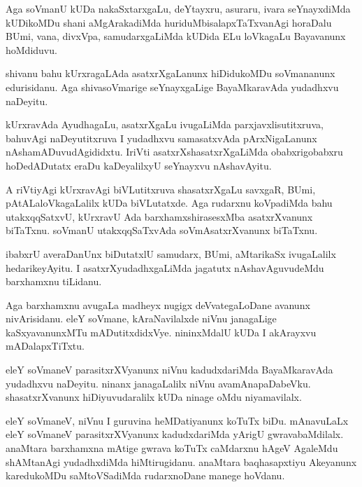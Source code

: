 \documentclass{article}
\begin{document}
\begin{mn}%
Aga soVmanU kUDa nakaSxtarxgaLu, deYtayxru, asuraru, ivara
seYnayxdiMda kUDikoMDu shani aMgArakadiMda huriduMbisalapxTaTxvanAgi
horaDalu BUmi, vana, divxVpa, samudarxgaLiMda kUDida ELu loVkagaLu
Bayavanunx hoMdiduvu.
\end{mn}

\begin{mn}
shivanu bahu kUrxragaLAda asatxrXgaLanunx hiDidukoMDu soVmananunx
edurisidanu. Aga shivasoVmarige seYnayxgaLige BayaMkaravAda yudadhxvu naDeyitu.
\end{mn}

\begin{mn}
kUrxravAda AyudhagaLu, asatxrXgaLu ivugaLiMda parxjavxlisutitxruva,
bahuvAgi naDeyutitxruva I yudadhxvu samasatxvAda pArxNigaLanunx
nAshamADuvudAgididxtu. IriVti asatxrXshasatxrXgaLiMda obabxrigobabxru
hoDedADutatx eraDu kaDeyalilxyU seYnayxvu nAshavAyitu.
\end{mn}

\begin{mn}%
A riVtiyAgi kUrxravAgi biVLutitxruva shasatxrXgaLu savxgaR, BUmi,
pAtALaloVkagaLalilx kUDa biVLutatxde. Aga rudarxnu koVpadiMda bahu
utakxqqSatxvU, kUrxravU Ada barxhamxshirasesxMba asatxrXvanunx
biTaTxnu. soVmanU utakxqqSaTxvAda soVmAsatxrXvanunx biTaTxnu.
\end{mn}

\begin{mn}
ibabxrU averaDanUnx biDutatxlU samudarx, BUmi, aMtarikaSx ivugaLalilx
hedarikeyAyitu. I asatxrXyudadhxgaLiMda jagatutx nAshavAguvudeMdu
barxhamxnu tiLidanu.
\end{mn}

\begin{mn}
Aga barxhamxnu avugaLa madheyx nugigx deVvategaLoDane avanunx
nivArisidanu. eleY soVmane, kAraNavilalxde niVnu janagaLige
kaSxyavanunxMTu mADutitxdidxVye. nininxMdalU kUDa I akArayxvu mADalapxTiTxtu.
\end{mn}

\begin{mn}%
eleY soVmaneV parasitxrXVyanunx niVnu kadudxdariMda BayaMkaravAda
yudadhxvu naDeyitu. ninanx janagaLalilx niVnu
avamAnapaDabeVku. shasatxrXvanunx hiDiyuvudaralilx kUDa ninage oMdu niyamavilalx.
\end{mn}

\begin{mn}
eleY soVmaneV, niVnu I guruvina heMDatiyanunx koTuTx biDu. mAnavuLaLx
eleY soVmaneV parasitxrXVyanunx kadudxdariMda yArigU
gwravabaMdilalx. anaMtara barxhamxna mAtige gwrava koTuTx caMdarxnu
hAgeV AgaleMdu shAMtanAgi yudadhxdiMda hiMtirugidanu. anaMtara
baqhasapxtiyu Akeyanunx karedukoMDu saMtoVSadiMda rudarxnoDane manege hoVdanu.
\end{mn}
\end{document}
